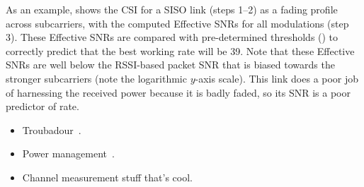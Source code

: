 As an example,  shows the CSI for a SISO link (steps 1--2) as a fading profile across subcarriers, with the computed Effective SNRs for all modulations (step 3). These Effective SNRs are compared with pre-determined thresholds () to correctly predict that the best working rate will be 39\Mbps. 
Note that these Effective SNRs are well below the RSSI-based packet SNR that is biased towards the stronger subcarriers (note the logarithmic $y$-axis scale). This link does a poor job of harnessing the received power because it is badly faded, so its SNR is a poor predictor of rate.



\begin{itemize}
\item Troubadour~\cite{halperin_troubadour}.
\item Power management~\cite{halperin_power}.
\item Channel measurement stuff that's cool.
\end{itemize}
\fi